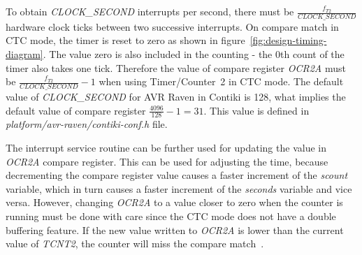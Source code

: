 To obtain {\it{CLOCK\_SECOND}} interrupts per second, there must be
${\frac{f_{T2}}{CLOCK\_SECOND}}$ hardware clock ticks between two successive interrupts.
On compare match in CTC mode, the timer is reset to zero as
shown in figure~\ref{fig:design-timing-diagram}.
The value zero is also included in the counting - the 0th count of the timer also takes one tick.
Therefore the value of compare register {\it{OCR2A}} must be ${\frac{f_{T2}}{CLOCK\_SECOND}} - 1$
when using Timer/Counter~2 in CTC mode.
The default value of {\it{CLOCK\_SECOND}} for AVR Raven in Contiki is 128,
what implies the default value of compare register ${\frac{4096}{128}} - 1 = 31$.
This value is defined in {\it{platform/avr-raven/contiki-conf.h}} file.

The interrupt service routine can be further used for updating the value in {\it{OCR2A}} compare register.
This can be used for adjusting the time, because decrementing the compare register
value causes a faster increment of the {\it{scount}} variable, which in turn causes
a faster increment of the {\it{seconds}} variable and vice versa.
However, changing {\it{OCR2A}} to a value closer to zero when the counter is running
must be done with care since the CTC mode does not have a double buffering feature.
If the new value written to {\it{OCR2A}} is lower than the current
value of {\it{TCNT2}}, the counter will miss the compare match~\cite{avr-datasheet}.
